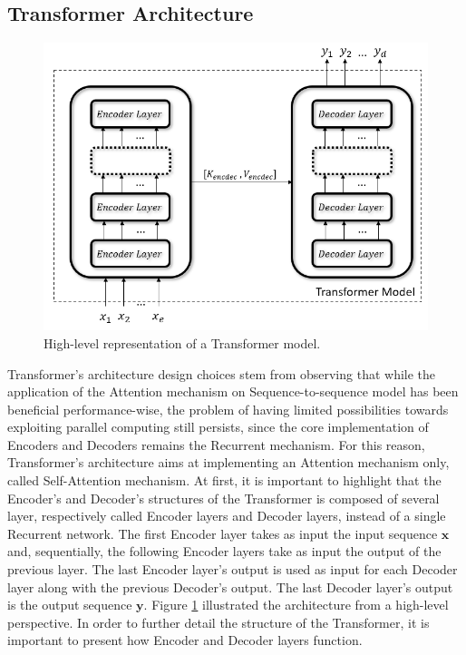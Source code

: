         \subsection{Transformer Architecture}
        \label{sub:transformer}
        \begin{figure}[!t]
                \centering
                \includegraphics[width=15cm, keepaspectratio]{images/an/transformer.png}
                \caption{High-level representation of a Transformer model.}
                \label{fig:an_transformer}
        \end{figure}
        
            Transformer's architecture design choices stem from observing that while the application of the Attention mechanism on Sequence-to-sequence model has been beneficial performance-wise, the problem of having limited possibilities towards exploiting parallel computing still persists, since the core implementation of Encoders and Decoders remains the Recurrent mechanism. For this reason, Transformer's architecture aims at implementing an Attention mechanism only, called Self-Attention mechanism.\newline
            At first, it is important to highlight that the Encoder's and Decoder's structures of the Transformer is composed of several layer, respectively called Encoder layers and Decoder layers, instead of a single Recurrent network. The first Encoder layer takes as input the input sequence $\mathbf{x}$ and, sequentially, the following Encoder layers take as input the output of the previous layer. The last Encoder layer's output is used as input for each Decoder layer along with the previous Decoder's output. The last Decoder layer's output is the output sequence $\mathbf{y}$. Figure \ref{fig:an_transformer} illustrated the architecture from a high-level perspective. In order to further detail the structure of the Transformer, it is important to present how Encoder and Decoder layers function.
            
